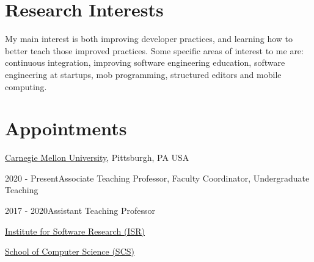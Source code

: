 \documentclass[10pt]{article}
\begin{document}

% 
\thispagestyle{empty}
\section{Research Interests}
My main interest is both improving developer practices, and learning how to better teach those improved practices. 
Some specific areas of interest to me are: continuous integration, improving software engineering education, software engineering at startups, mob programming, structured editors and mobile computing.
%



\section{Appointments}

 \href{https://www.cmu.edu/}{Carnegie Mellon University},
Pittsburgh, PA USA

2020 - Present\qquad Associate Teaching Professor, 
Faculty Coordinator, Undergraduate Teaching



2017 - 2020\qquad Assistant Teaching Professor

\href{http://www.isri.cmu.edu/}{Institute for Software Research (ISR)}

\href{https://www.cs.cmu.edu/}{School of Computer Science (SCS)}    
\end{document}
